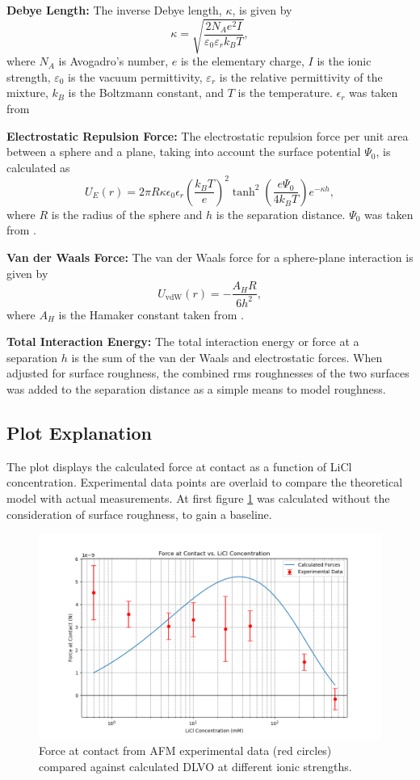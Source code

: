 \textbf{Debye Length:} The inverse Debye length, $\kappa$, is given by
    \[
    \kappa = \sqrt{\frac{2 N_A e^2 I}{\varepsilon_0 \varepsilon_r k_B T}},
    \]
    where $N_A$ is Avogadro's number, $e$ is the elementary charge, $I$ is the ionic strength, $\varepsilon_0$ is the vacuum permittivity, $\varepsilon_r$ is the relative permittivity of the mixture, $k_B$ is the Boltzmann constant, and $T$ is the temperature. $\epsilon_r$ was taken from \cite{behrends2006dielectric}
    
\textbf{Electrostatic Repulsion Force:} The electrostatic repulsion force per unit area between a sphere and a plane, taking into account the surface potential $\Psi_0$, is calculated as
    \[
    U_E(r) = 2 \pi R \kappa \epsilon_0 \epsilon_r \left( \frac{k_B T}{e} \right)^2 \tanh^2\left(\frac{e \Psi_0}{4 k_B T}\right) e^{-\kappa h},
    \]
    where $R$ is the radius of the sphere and $h$ is the separation distance. $\Psi_0$ was taken from \cite{silica2021}.
    
\textbf{Van der Waals Force:} The van der Waals force for a sphere-plane interaction is given by
    \[
    U_{\text{vdW}}(r) = -\frac{A_H R}{6 h^2},
    \]
    where $A_H$ is the Hamaker constant taken from \cite{Bergstrom1997}.
    
\textbf{Total Interaction Energy:} The total interaction energy or force at a separation $h$ is the sum of the van der Waals and electrostatic forces. When adjusted for surface roughness, the combined rms roughnesses of the two surfaces was added to the separation distance as a simple means to model roughness.


\subsection*{Plot Explanation}

The plot displays the calculated force at contact as a function of LiCl concentration. Experimental data points are overlaid to compare the theoretical model with actual measurements. At first figure \ref{fig:calc1} was calculated without the consideration of surface roughness, to gain a baseline.

\begin{figure}[h!]
\centering
\includegraphics[width=\textwidth]{chapter8/Calculated/No_roughness.png}
\caption{Force at contact from AFM experimental data (red circles) compared against calculated DLVO at different ionic strengths.}
\label{fig:calc1}
\end{figure}

